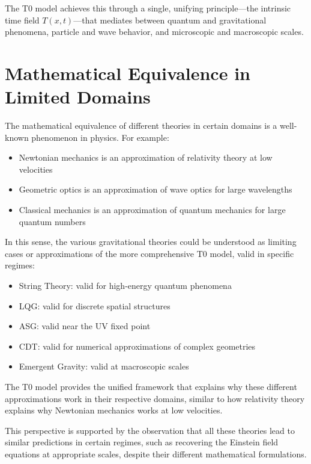 \documentclass[12pt,a4paper]{article}
\newcommand{\Tfieldt}{T(x,t)}
\begin{document}
	The T0 model achieves this through a single, unifying principle—the intrinsic time field $\Tfieldt$—that mediates between quantum and gravitational phenomena, particle and wave behavior, and microscopic and macroscopic scales.
	
	\section{Mathematical Equivalence in Limited Domains}
	\label{sec:domains}
	
	The mathematical equivalence of different theories in certain domains is a well-known phenomenon in physics. For example:
	
	\begin{itemize}
		\item Newtonian mechanics is an approximation of relativity theory at low velocities
		\item Geometric optics is an approximation of wave optics for large wavelengths
		\item Classical mechanics is an approximation of quantum mechanics for large quantum numbers
	\end{itemize}
	
	In this sense, the various gravitational theories could be understood as limiting cases or approximations of the more comprehensive T0 model, valid in specific regimes:
	
	\begin{itemize}
		\item String Theory: valid for high-energy quantum phenomena
		\item LQG: valid for discrete spatial structures
		\item ASG: valid near the UV fixed point
		\item CDT: valid for numerical approximations of complex geometries
		\item Emergent Gravity: valid at macroscopic scales
	\end{itemize}
	
	The T0 model provides the unified framework that explains why these different approximations work in their respective domains, similar to how relativity theory explains why Newtonian mechanics works at low velocities.
	
	This perspective is supported by the observation that all these theories lead to similar predictions in certain regimes, such as recovering the Einstein field equations at appropriate scales, despite their different mathematical formulations.
	
\end{document}
